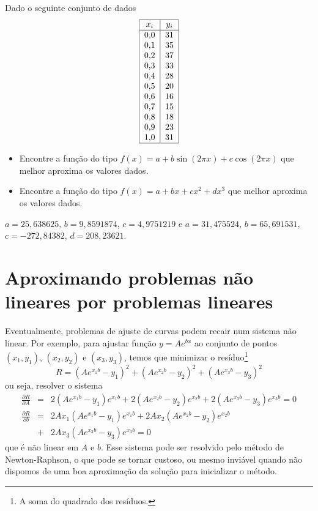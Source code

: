 \begin{Exercise} Dado o seguinte conjunto de dados
  \begin{equation*}
    \begin{tabular}{|c|c|}
      \hline
      $x_i$ & $y_i$\\
      \hline
      0,0 &  31\\
      0,1 &  35\\
      0,2 &  37\\
      0,3 &  33\\
      0,4 &  28\\
      0,5 &  20\\
      0,6 &  16\\
      0,7 &  15\\
      0,8 &  18\\
      0,9 &  23\\
      1,0 &  31\\
      \hline
    \end{tabular}    
  \end{equation*}
\begin{itemize}
\item Encontre a função do tipo $f(x)=a+b\sin(2\pi x)+c\cos(2\pi x)$ que melhor aproxima os valores dados.
\item Encontre a função do tipo $f(x)=a+bx+cx^2+dx^3$ que melhor aproxima os valores dados.
\end{itemize}
\end{Exercise}
\begin{Answer}
  \begin{tiny}
      $a=25,638625$, $b=9,8591874$, $c=4,9751219$ e   $a=31,475524$, $b=65,691531$, $c=-272,84382$, $d=208,23621$.
  \end{tiny}
\end{Answer}

\section{Aproximando problemas não lineares por problemas lineares}

Eventualmente, problemas de ajuste de curvas podem recair num sistema não linear. Por exemplo, para ajustar função $y=Ae^{bx}$ ao conjunto de pontos $(x_1,y_1)$, $(x_2,y_2)$ e $(x_3,y_3)$, temos que minimizar o resíduo\footnote{A soma do quadrado dos resíduos.} 
$$
R=(Ae^{x_1b}-y_1)^2+(Ae^{x_2b}-y_2)^2+(Ae^{x_3b}-y_3)^2
$$
ou seja, resolver o sistema
\begin{eqnarray*}
\frac{\partial R}{\partial A} &=& 2(Ae^{x_1b}-y_1)e^{x_1b}+2(Ae^{x_2b}-y_2)e^{x_2b}+2(Ae^{x_3b}-y_3)e^{x_3b}=0\\
\frac{\partial R}{\partial b} &=& 2Ax_1(Ae^{x_1b}-y_1)e^{x_1b} + 2Ax_2(Ae^{x_2b}-y_2)e^{x_2b} \\
&+& 2Ax_3(Ae^{x_3b}-y_3)e^{x_3b}=0
\end{eqnarray*}
que é não linear em $A$ e $b$. Esse sistema pode ser resolvido pelo método de Newton-Raphson, o que pode se tornar custoso, ou mesmo inviável quando não dispomos de uma boa aproximação da solução para inicializar o método.


